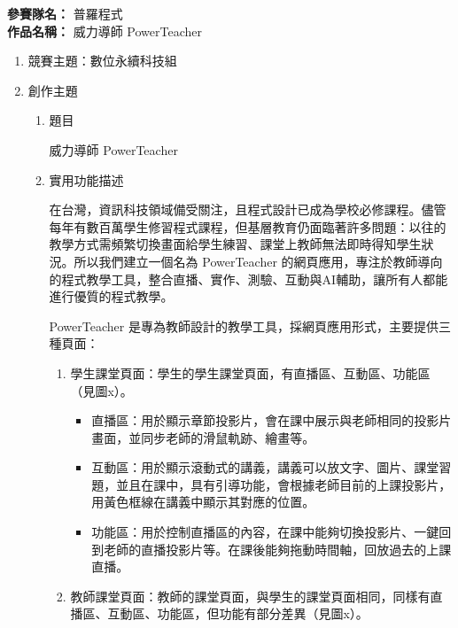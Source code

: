 \documentclass[12pt]{article}
\begin{document}
\date{}
\usetikzlibrary{automata, positioning, arrows}
{}

\noindent
\textbf{參賽隊名：} 普羅程式 \\
\textbf{作品名稱：} 威力導師 PowerTeacher \\

\begin{enumerate}
  \setlength{\parindent}{2em}
  \item 競賽主題：數位永續科技組 
  \item 創作主題
    \begin{enumerate}
      \setlength{\parindent}{2em}
      \item 題目
        \par 威力導師 PowerTeacher
      \item 實用功能描述
        \par 在台灣，資訊科技領域備受關注，且程式設計已成為學校必修課程。儘管每年有數百萬學生修習程式課程，但基層教育仍面臨著許多問題：以往的教學方式需頻繁切換畫面給學生練習、課堂上教師無法即時得知學生狀況。所以我們建立一個名為 PowerTeacher 的網頁應用，專注於教師導向的程式教學工具，整合直播、實作、測驗、互動與AI輔助，讓所有人都能進行優質的程式教學。
        \par PowerTeacher 是專為教師設計的教學工具，採網頁應用形式，主要提供三種頁面：
        \begin{enumerate}[label=(\arabic*)]
          \item 學生課堂頁面：學生的學生課堂頁面，有直播區、互動區、功能區（見圖x）。
            \begin{itemize}
              \item 直播區：用於顯示章節投影片，會在課中展示與老師相同的投影片畫面，並同步老師的滑鼠軌跡、繪畫等。
              \item 互動區：用於顯示滾動式的講義，講義可以放文字、圖片、課堂習題，並且在課中，具有引導功能，會根據老師目前的上課投影片，用黃色框線在講義中顯示其對應的位置。
              \item 功能區：用於控制直播區的內容，在課中能夠切換投影片、一鍵回到老師的直播投影片等。在課後能夠拖動時間軸，回放過去的上課直播。
            \end{itemize}
          \item 教師課堂頁面：教師的課堂頁面，與學生的課堂頁面相同，同樣有直播區、互動區、功能區，但功能有部分差異（見圖x）。

\end{enumerate}
\end{enumerate}
\end{enumerate}
\end{document}
